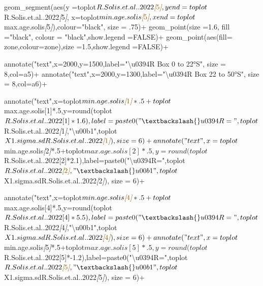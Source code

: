 \documentclass[
]{article}
\newenvironment{Shaded}{\begin{snugshade}}{\end{snugshade}}
\newcommand{\CommentTok}[1]{\textcolor[rgb]{0.56,0.35,0.01}{\textit{#1}}}
\newcommand{\NormalTok}[1]{#1}
\newcommand{\OtherTok}[1]{\textcolor[rgb]{0.56,0.35,0.01}{#1}}
\begin{document}
\begin{Shaded}
\begin{Highlighting}[]
\NormalTok{  geom\_segment(aes(y =toplot$R.Solis.et.al..2022}\CommentTok{[}\OtherTok{5}\CommentTok{]}\NormalTok{,}
\NormalTok{                   yend =toplot$R.Solis.et.al..2022}\CommentTok{[}\OtherTok{5}\CommentTok{]}\NormalTok{,}
\NormalTok{                   x=toplot$min.age.solis}\CommentTok{[}\OtherTok{5}\CommentTok{]}\NormalTok{,}
\NormalTok{                   xend=toplot$max.age.solis}\CommentTok{[}\OtherTok{5}\CommentTok{]}\NormalTok{),colour="black", size = .75)+}
\NormalTok{  geom\_point(size =1.6, fill ="black", colour = "black",show.legend =FALSE)+}
\NormalTok{  geom\_point(aes(fill= zone,colour=zone),size =1.5,show.legend =FALSE)+}
 
\NormalTok{  annotate("text",x=2000,y=1500,label="\textbackslash{}u0394R Box  0 to 22°S", size = 8,col=a5)+}
\NormalTok{  annotate("text",x=2000,y=1300,label="\textbackslash{}u0394R Box 22 to 50°S", size = 8,col=a6)+}
  
\NormalTok{  annotate("text",x=toplot$min.age.solis}\CommentTok{[}\OtherTok{1}\CommentTok{]}\NormalTok{*.5+toplot$max.age.solis[1]*.5,y=round(toplot$R.Solis.et.al..2022[1]*1.6),label=paste0("\textbackslash{}u0394R=",toplot$R.Solis.et.al..2022}\CommentTok{[}\OtherTok{1}\CommentTok{]}\NormalTok{,"\textbackslash{}u00b1",toplot$X1.sigma.sdR.Solis.et.al..2022}\CommentTok{[}\OtherTok{1}\CommentTok{]}\NormalTok{), size = 6)+}
\NormalTok{  annotate("text",x=toplot$min.age.solis}\CommentTok{[}\OtherTok{2}\CommentTok{]}\NormalTok{*.5+toplot$max.age.solis[2]*.5,y=round(toplot$R.Solis.et.al..2022[2]*2.1),label=paste0("\textbackslash{}u0394R=",toplot$R.Solis.et.al..2022}\CommentTok{[}\OtherTok{2}\CommentTok{]}\NormalTok{,"\textbackslash{}u00b1",toplot$X1.sigma.sdR.Solis.et.al..2022}\CommentTok{[}\OtherTok{2}\CommentTok{]}\NormalTok{), size = 6)+}
  
\NormalTok{  annotate("text",x=toplot$min.age.solis}\CommentTok{[}\OtherTok{4}\CommentTok{]}\NormalTok{*.5+toplot$max.age.solis[4]*.5,y=round(toplot$R.Solis.et.al..2022[4]*5.5),label=paste0("\textbackslash{}u0394R=",toplot$R.Solis.et.al..2022}\CommentTok{[}\OtherTok{4}\CommentTok{]}\NormalTok{,"\textbackslash{}u00b1",toplot$X1.sigma.sdR.Solis.et.al..2022}\CommentTok{[}\OtherTok{4}\CommentTok{]}\NormalTok{), size = 6)+}
\NormalTok{  annotate("text",x=toplot$min.age.solis}\CommentTok{[}\OtherTok{5}\CommentTok{]}\NormalTok{*.5+toplot$max.age.solis[5]*.5,y=round(toplot$R.Solis.et.al..2022[5]*{-}1.2),label=paste0("\textbackslash{}u0394R=",toplot$R.Solis.et.al..2022}\CommentTok{[}\OtherTok{5}\CommentTok{]}\NormalTok{,"\textbackslash{}u00b1",toplot$X1.sigma.sdR.Solis.et.al..2022}\CommentTok{[}\OtherTok{5}\CommentTok{]}\NormalTok{), size = 6)+}
  

\end{Highlighting}
\end{Shaded}
\end{document}
